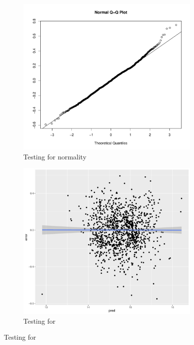 \begin{figure}[H]
\centering
\begin{subfigure}[b]{0.5\textwidth}
    \centering
    \includegraphics[width = \textwidth]{figures/Nanna/Normal.pdf}
    \caption{Testing for normality}
    \label{fig:cv_normal}
\end{subfigure}%
\begin{subfigure}[b]{0.5\textwidth}
\centering
    \includegraphics[width = \textwidth]{figures/Nanna/Homo.pdf}
    \caption{Testing for \hetero}
    \label{fig:cv_homo}
\end{subfigure}
\label{fig:cv_normal_homo}
\end{figure}

